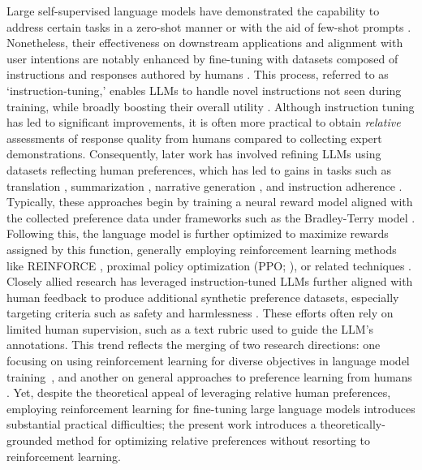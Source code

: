 Large self-supervised language models have demonstrated the capability to address certain tasks in a zero-shot manner \citep{radford2019language} or with the aid of few-shot prompts \citep{gpt3,megatron,chowdhery2022palm}. Nonetheless, their effectiveness on downstream applications and alignment with user intentions are notably enhanced by fine-tuning with datasets composed of instructions and responses authored by humans \citep{mishra-etal-2022-cross,sanh2022multitask,chung2022scaling,thoppilan2022lamda}. This process, referred to as `instruction-tuning,' enables LLMs to handle novel instructions not seen during training, while broadly boosting their overall utility \citep{chung2022scaling}. Although instruction tuning has led to significant improvements, it is often more practical to obtain \textit{relative} assessments of response quality from humans compared to collecting expert demonstrations. Consequently, later work has involved refining LLMs using datasets reflecting human preferences, which has led to gains in tasks such as translation \citep{kreutzer-etal-2018-reliability}, summarization \citep{stiennon2022learning,ziegler2020finetuning}, narrative generation \citep{ziegler2020finetuning}, and instruction adherence \citep{ouyang2022training,ramamurthy2023is}. Typically, these approaches begin by training a neural reward model aligned with the collected preference data under frameworks such as the Bradley-Terry model \citep{bradley1952rankanalysis}. Following this, the language model is further optimized to maximize rewards assigned by this function, generally employing reinforcement learning methods like REINFORCE \citep{williams1992reinforce}, proximal policy optimization (PPO; \cite{schulman2017proximal}), or related techniques \citep{ramamurthy2023is}. Closely allied research has leveraged instruction-tuned LLMs further aligned with human feedback to produce additional synthetic preference datasets, especially targeting criteria such as safety and harmlessness \citep{bai2022constitutional}. These efforts often rely on limited human supervision, such as a text rubric used to guide the LLM’s annotations. This trend reflects the merging of two research directions: one focusing on using reinforcement learning for diverse objectives in language model training~\citep{Ranzato2015SequenceLT,paulus2018a,wu2018learning}, and another on general approaches to preference learning from humans \citep{christiano2017deep,kupcsik2018learning}. Yet, despite the theoretical appeal of leveraging relative human preferences, employing reinforcement learning for fine-tuning large language models introduces substantial practical difficulties; the present work introduces a theoretically-grounded method for optimizing relative preferences without resorting to reinforcement learning.

